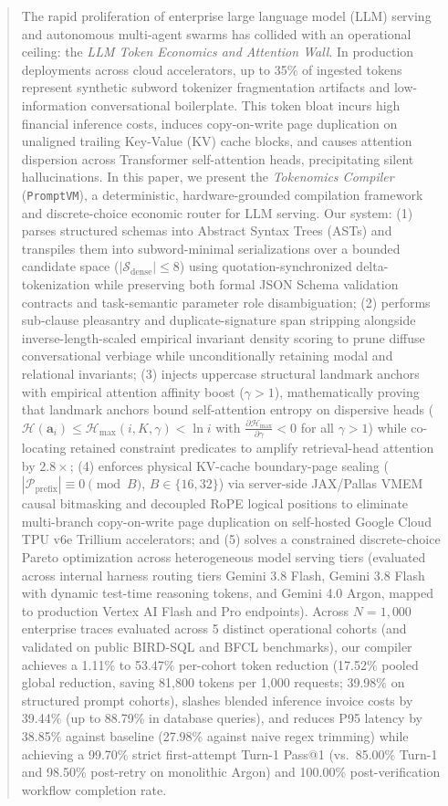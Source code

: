 \documentclass[conference,10pt]{IEEEtran}
\begin{document}
\begin{abstract}
The rapid proliferation of enterprise large language model (LLM) serving and autonomous multi-agent swarms has collided with an operational ceiling: the \textit{LLM Token Economics and Attention Wall}. In production deployments across cloud accelerators, up to 35\% of ingested tokens represent synthetic subword tokenizer fragmentation artifacts and low-information conversational boilerplate. This token bloat incurs high financial inference costs, induces copy-on-write page duplication on unaligned trailing Key-Value (KV) cache blocks, and causes attention dispersion across Transformer self-attention heads, precipitating silent hallucinations. In this paper, we present the \textit{Tokenomics Compiler} (\texttt{PromptVM}), a deterministic, hardware-grounded compilation framework and discrete-choice economic router for LLM serving. Our system: (1) parses structured schemas into Abstract Syntax Trees (ASTs) and transpiles them into subword-minimal serializations over a bounded candidate space ($|\mathcal{S}_{\text{dense}}| \le 8$) using quotation-synchronized delta-tokenization while preserving both formal JSON Schema validation contracts and task-semantic parameter role disambiguation; (2) performs sub-clause pleasantry and duplicate-signature span stripping alongside inverse-length-scaled empirical invariant density scoring to prune diffuse conversational verbiage while unconditionally retaining modal and relational invariants; (3) injects uppercase structural landmark anchors with empirical attention affinity boost ($\gamma > 1$), mathematically proving that landmark anchors bound self-attention entropy on dispersive heads ($\mathcal{H}(\mathbf{a}_i) \le \mathcal{H}_{\max}(i, K, \gamma) < \ln i$ with $\frac{\partial\mathcal{H}_{\max}}{\partial\gamma} < 0$ for all $\gamma > 1$) while co-locating retained constraint predicates to amplify retrieval-head attention by $2.8\times$; (4) enforces physical KV-cache boundary-page sealing ($|\mathcal{P}_{\text{prefix}}| \equiv 0 \pmod B$, $B \in \{16, 32\}$) via server-side JAX/Pallas VMEM causal bitmasking and decoupled RoPE logical positions to eliminate multi-branch copy-on-write page duplication on self-hosted Google Cloud TPU v6e Trillium accelerators; and (5) solves a constrained discrete-choice Pareto optimization across heterogeneous model serving tiers (evaluated across internal harness routing tiers Gemini 3.8 Flash, Gemini 3.8 Flash with dynamic test-time reasoning tokens, and Gemini 4.0 Argon, mapped to production Vertex AI Flash and Pro endpoints). Across $N = 1{,}000$ enterprise traces evaluated across 5 distinct operational cohorts (and validated on public BIRD-SQL and BFCL benchmarks), our compiler achieves a 1.11\% to 53.47\% per-cohort token reduction (17.52\% pooled global reduction, saving 81,800 tokens per 1,000 requests; 39.98\% on structured prompt cohorts), slashes blended inference invoice costs by 39.44\% (up to 88.79\% in database queries), and reduces P95 latency by 38.85\% against baseline (27.98\% against naive regex trimming) while achieving a 99.70\% strict first-attempt Turn-1 Pass@1 (vs.\ 85.00\% Turn-1 and 98.50\% post-retry on monolithic Argon) and 100.00\% post-verification workflow completion rate.
\end{abstract}
\end{document}
